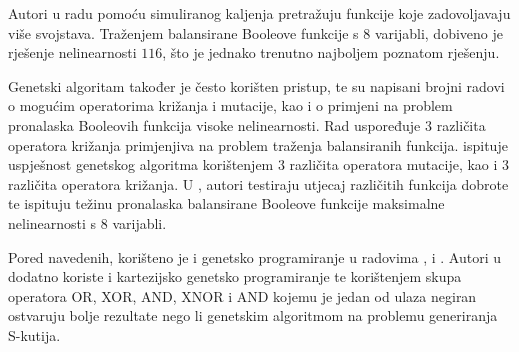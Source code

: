 Autori u radu \cite{EvolvingBoolean} pomoću simuliranog kaljenja  \cite{SimulatedAnnealing} pretražuju funkcije koje zadovoljavaju više svojstava.
Traženjem balansirane Booleove funkcije s $8$ varijabli, dobiveno je rješenje nelinearnosti $116$, što je jednako trenutno najboljem poznatom rješenju.

Genetski algoritam \cite{holland1992adaptation} također je često korišten pristup, te su napisani brojni radovi o mogućim operatorima križanja i mutacije, kao i o primjeni na problem pronalaska Booleovih funkcija visoke nelinearnosti.
Rad \cite{manzoni2019balanced} uspoređuje $3$ različita operatora križanja primjenjiva na problem traženja balansiranih funkcija.
\cite{picek2014using} ispituje uspješnost genetskog algoritma korištenjem $3$ različita operatora mutacije, kao i $3$ različita operatora križanja.
U \cite{MaximalNonlinearity}, autori testiraju utjecaj različitih funkcija dobrote te ispituju težinu pronalaska balansirane Booleove funkcije maksimalne nelinearnosti s 8 varijabli.

Pored navedenih, korišteno je i genetsko programiranje \cite{koza1992genetic} u radovima \cite{picek2015cartesian}, \cite{picek2013evolving} i \cite{tesavr2010new}.
Autori u \cite{picek2015cartesian} dodatno koriste i kartezijsko genetsko programiranje te korištenjem skupa operatora OR, XOR, AND, XNOR i AND kojemu je jedan od ulaza negiran ostvaruju bolje rezultate nego li genetskim algoritmom na problemu generiranja S-kutija. 
